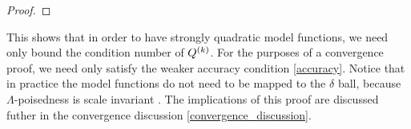 \begin{proof}





\end{proof}

This shows that in order to have strongly quadratic model functions, we need only bound the condition number of ${Q^{(k)}}$.
For the purposes of a convergence proof, we need only satisfy the weaker accuracy condition \cref{accuracy}.
Notice that in practice the model functions do not need to be mapped to the $\delta$ ball, because $\Lambda$-poisedness is scale invariant \cite{DUMMY:intro_book}.
The implications of this proof are discussed futher in the convergence discussion \cref{convergence_discussion}.


